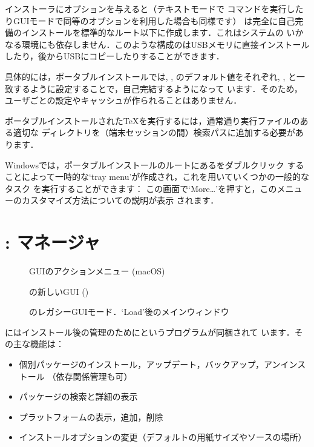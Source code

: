 \documentclass[uplatex,dvipdfmx,tombow]{jsarticle}
\begin{document}
\TL インストーラにオプションを与えると（テキストモードで%
コマンドを実行したりGUIモードで同等のオプションを利用した場合も同様です）\TL
は完全に自己完備のインストールを標準的なルート以下に作成します．これはシステムの
いかなる環境にも依存しません．このような構成の\TL はUSBメモリに直接インストール
したり，後からUSBにコピーしたりすることができます．

具体的には，ポータブルインストールでは, , のデフォルト値をそれぞれ, ,
と一致するように設定することで，自己完結するようになって
います．そのため，ユーザごとの設定やキャッシュが作られることはありません．

ポータブルインストールされた\TeX を実行するには，通常通り実行ファイルのある適切な
ディレクトリを（端末セッションの間）検索パスに追加する必要があります．

Windowsでは，ポータブルインストールのルートにあるをダブルクリック
することによって一時的な`tray menu'が作成され，これを用いていくつかの一般的なタスク
を実行することができます：
%
\medskip
{}
\smallskip
%
この画面で`More\ldots'を押すと，このメニューのカスタマイズ方法についての説明が表示
されます．

\section{: \TL マネージャ}
\label{sec:tlmgr}

\begin{figure}[tb]
\caption{ GUIのアクションメニュー (macOS)}
\label{fig:tlshell}
\end{figure}

\begin{figure}[tb]
\caption{の新しい{GUI} ()}
\label{fig:tlcockpit}
\end{figure}

\begin{figure}[tb]
\caption{のレガシーGUIモード．`Load'後のメインウィンドウ}
\label{fig:tlmgr-gui}
\end{figure}

\TL にはインストール後の\TL 管理のためにというプログラムが同梱されて
います．その主な機能は：
%
\begin{itemize}
\item 個別パッケージのインストール，アップデート，バックアップ，アンインストール
  （依存関係管理も可）
\item パッケージの検索と詳細の表示
\item プラットフォームの表示，追加，削除
\item インストールオプションの変更（デフォルトの用紙サイズやソースの場所）
\end{itemize}
\end{document}
